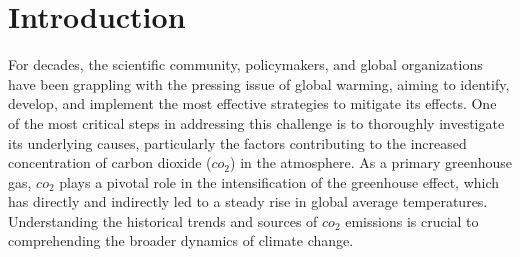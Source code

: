 \documentclass[
]{article}
\newenvironment{Shaded}{\begin{snugshade}}{\end{snugshade}}
\newcommand{\AttributeTok}[1]{\textcolor[rgb]{0.13,0.29,0.53}{#1}}
\newcommand{\CommentTok}[1]{\textcolor[rgb]{0.56,0.35,0.01}{\textit{#1}}}
\newcommand{\DecValTok}[1]{\textcolor[rgb]{0.00,0.00,0.81}{#1}}
\newcommand{\FunctionTok}[1]{\textcolor[rgb]{0.13,0.29,0.53}{\textbf{#1}}}
\newcommand{\NormalTok}[1]{#1}
\newcommand{\OtherTok}[1]{\textcolor[rgb]{0.56,0.35,0.01}{#1}}
\newcommand{\SpecialCharTok}[1]{\textcolor[rgb]{0.81,0.36,0.00}{\textbf{#1}}}
\newcommand{\StringTok}[1]{\textcolor[rgb]{0.31,0.60,0.02}{#1}}
\begin{document}
\begin{Shaded}
\end{Shaded}

\hypertarget{introduction}{%
\section{Introduction}\label{introduction}}

For decades, the scientific community, policymakers, and global
organizations have been grappling with the pressing issue of global
warming, aiming to identify, develop, and implement the most effective
strategies to mitigate its effects. One of the most critical steps in
addressing this challenge is to thoroughly investigate its underlying
causes, particularly the factors contributing to the increased
concentration of carbon dioxide (\(co_2\)) in the atmosphere. As a
primary greenhouse gas, \(co_2\) plays a pivotal role in the
intensification of the greenhouse effect, which has directly and
indirectly led to a steady rise in global average temperatures.
Understanding the historical trends and sources of \(co_2\) emissions is
crucial to comprehending the broader dynamics of climate change.
\end{document}
